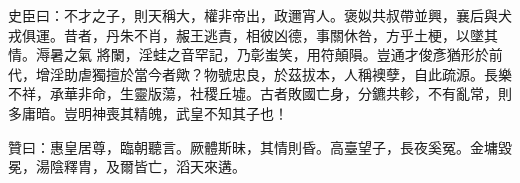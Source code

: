 \begin{pinyinscope}
 史臣曰：不才之子，則天稱大，權非帝出，政邇宵人。褒姒共叔帶並興，襄后與犬戎俱運。昔者，丹朱不肖，赧王逃責，相彼凶德，事關休咎，方乎土梗，以墜其情。溽暑之氣
 將闌，淫蛙之音罕記，乃彰蚩笑，用符顛隕。豈通才俊彥猶形於前代，增淫助虐獨擅於當今者歟？物號忠良，於茲拔本，人稱襖孽，自此疏源。長樂不祥，承華非命，生靈版蕩，社稷丘墟。古者敗國亡身，分鑣共軫，不有亂常，則多庸暗。豈明神喪其精魄，武皇不知其子也！



 贊曰：惠皇居尊，臨朝聽言。厥體斯昧，其情則昏。高臺望子，長夜奚冤。金墉毀冕，湯陰釋胄，及爾皆亡，滔天來遘。



\end{pinyinscope}